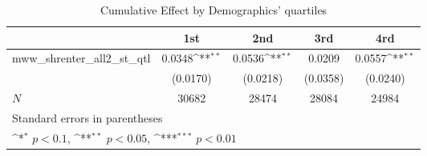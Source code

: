 \begin{table}[htbp]\centering
\def\sym#1{\ifmmode^{#1}\else\(^{#1}\)\fi}
\caption{Cumulative Effect by Demographics' quartiles}
\begin{tabular}{l*{4}{c}}
\hline\hline
            &\multicolumn{1}{c}{1st}&\multicolumn{1}{c}{2nd}&\multicolumn{1}{c}{3rd}&\multicolumn{1}{c}{4rd}\\
\hline
mww\_shrenter\_all2\_st\_qtl&      0.0348\sym{**} &      0.0536\sym{**} &      0.0209         &      0.0557\sym{**} \\
            &    (0.0170)         &    (0.0218)         &    (0.0358)         &    (0.0240)         \\
\hline
\(N\)       &       30682         &       28474         &       28084         &       24984         \\
\hline\hline
\multicolumn{5}{l}{\footnotesize Standard errors in parentheses}\\
\multicolumn{5}{l}{\footnotesize \sym{*} \(p<0.1\), \sym{**} \(p<0.05\), \sym{***} \(p<0.01\)}\\
\end{tabular}
\end{table}
